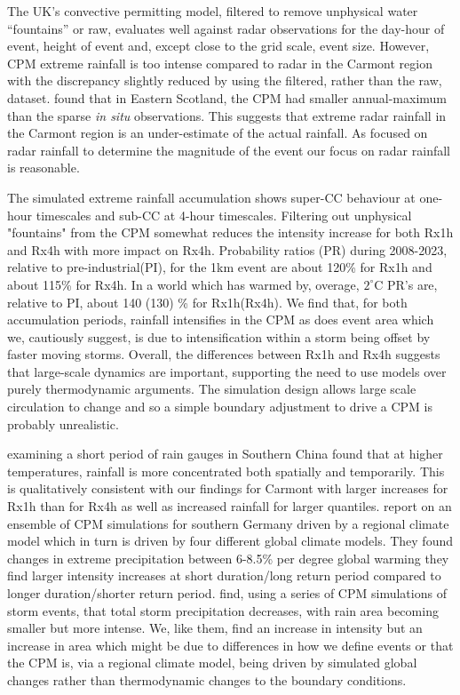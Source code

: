 \documentclass[11pt,a4paper]{article}
\begin{document}
The UK's convective permitting model\parencite{kendon2023uk_cpm}, filtered to remove unphysical water ``fountains'' or raw, evaluates  well against radar observations for the day-hour of  event, height of event and, except close to the grid scale, event size. However, CPM extreme rainfall is too intense compared to radar in the Carmont region with the discrepancy slightly reduced by using the filtered, rather than the raw,  dataset.  \cite{kendon2023uk_cpm} found that in Eastern Scotland, the CPM had smaller annual-maximum than the sparse \textit{in situ} observations. This suggests that extreme radar rainfall  in the Carmont region is an under-estimate of the actual rainfall.  As \cite{carmontReport2024} focused on radar rainfall  to determine the magnitude of the event our focus on radar rainfall is reasonable. 

The simulated extreme rainfall accumulation shows super-CC behaviour at one-hour timescales and sub-CC at 4-hour timescales. Filtering out unphysical "fountains" from the CPM somewhat reduces the intensity increase for both Rx1h and Rx4h with more impact on Rx4h.  Probability ratios (PR) during 2008-2023, relative to pre-industrial(PI), for the 1km event are about 120\% for Rx1h and about 115\%  for Rx4h.  In a world which has warmed by, overage, $2^\circ$C PR's are, relative to PI, about 140 (130) \% for Rx1h(Rx4h). We find that, for both accumulation periods, rainfall intensifies in the CPM as does event area which we, cautiously suggest, is due to intensification within a storm being offset by faster moving storms.   Overall, the differences between Rx1h and Rx4h  suggests that large-scale dynamics are important, supporting the need to use models over purely thermodynamic arguments. The simulation design allows large scale circulation to change and so a simple boundary adjustment to drive a CPM is probably unrealistic.  
 
 \cite{long2021rainfall_conc} examining a short period of rain gauges in Southern China found that at higher temperatures, rainfall is more concentrated both spatially and temporarily. This is qualitatively consistent with our findings for Carmont with larger increases for Rx1h than for Rx4h as well as increased rainfall for larger quantiles. \cite{hundhausen2024extreme_precip} report on an ensemble of CPM simulations for southern Germany driven by a regional climate model which in turn is driven by four different global climate models. They found changes in extreme precipitation between 6-8.5\% per degree global warming  they find larger intensity increases at short duration/long return period compared to longer duration/shorter return period. \cite{Moshe2022extremes} find, using a series of CPM simulations  of storm events, that total storm precipitation decreases, with rain area becoming smaller but more intense. We, like them, find an increase in intensity but an increase in area which might be due to differences in how we define events or that the CPM is, via a regional climate model, being driven by simulated global changes rather than thermodynamic changes to the boundary conditions. 
\end{document}
